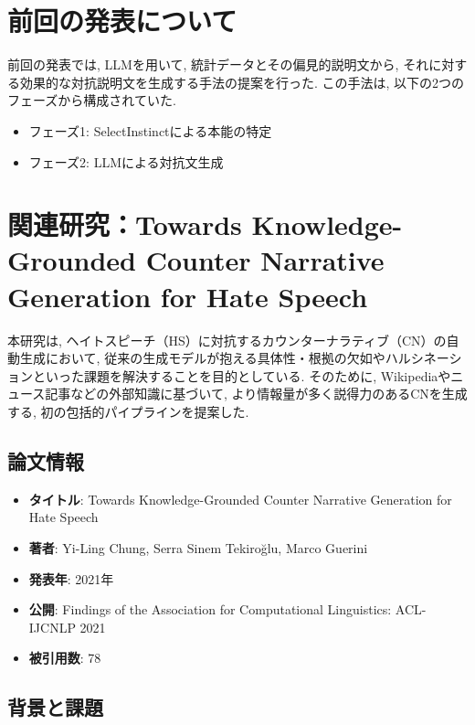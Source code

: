 \documentclass[dvipdfmx]{jsarticle}
\begin{document}
\section{前回の発表について}

前回の発表では, LLMを用いて, 統計データとその偏見的説明文から, それに対する効果的な対抗説明文を生成する手法の提案を行った.
この手法は, 以下の2つのフェーズから構成されていた.

\begin{itemize}
  \item フェーズ1: SelectInstinctによる本能の特定
  \item フェーズ2: LLMによる対抗文生成
\end{itemize}

\vspace{0.5em}

\section{関連研究：Towards Knowledge-Grounded Counter Narrative Generation for Hate Speech \cite{chung2021}}

本研究は, ヘイトスピーチ（HS）に対抗するカウンターナラティブ（CN）の自動生成において, 従来の生成モデルが抱える具体性・根拠の欠如やハルシネーションといった課題を解決することを目的としている.
そのために, Wikipediaやニュース記事などの外部知識に基づいて, より情報量が多く説得力のあるCNを生成する, 初の包括的パイプラインを提案した.

\subsection{論文情報}
\begin{itemize}
  \item \textbf{タイトル}: Towards Knowledge-Grounded Counter Narrative Generation for Hate Speech
  \item \textbf{著者}: Yi-Ling Chung, Serra Sinem Tekiroğlu, Marco Guerini
  \item \textbf{発表年}: 2021年
  \item \textbf{公開}: Findings of the Association for Computational Linguistics: ACL-IJCNLP 2021
  \item \textbf{被引用数}: 78
\end{itemize}

\vspace{0.5em}

\subsection{背景と課題}
\end{document}
